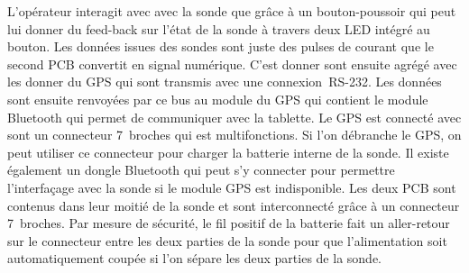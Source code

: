 L'opérateur interagit avec avec la sonde que grâce à un bouton-poussoir qui peut lui donner du feed-back sur l'état de la sonde à travers deux LED intégré au bouton. Les données issues des sondes sont juste des pulses de courant que le second PCB convertit en signal numérique. C'est donner sont ensuite agrégé avec les donner du GPS qui sont transmis avec une connexion~RS-232. Les données sont ensuite renvoyées par ce bus au module du GPS qui contient le module Bluetooth qui permet de communiquer avec la tablette. Le GPS est connecté avec sont un connecteur 7~broches qui est multifonctions. Si l’on débranche le GPS, on peut utiliser ce connecteur pour charger la batterie interne de la sonde. Il existe également un dongle Bluetooth qui peut s’y connecter pour permettre l'interfaçage avec la sonde si le module GPS est indisponible. Les deux PCB sont contenus dans leur moitié de la sonde et sont interconnecté grâce à un connecteur 7~broches. Par mesure de sécurité, le fil positif de la batterie fait un aller-retour sur le connecteur entre les deux parties de la sonde pour que l'alimentation soit automatiquement coupée si l’on sépare les deux parties de la sonde.